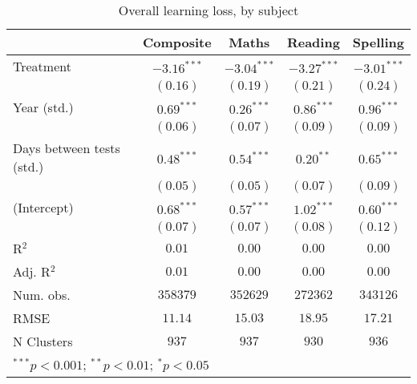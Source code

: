 
\begin{table}
\begin{center}
\begin{tabular}{l c c c c}
\hline
 & Composite & Maths & Reading & Spelling \\
\hline
Treatment                 & $-3.16^{***}$ & $-3.04^{***}$ & $-3.27^{***}$ & $-3.01^{***}$ \\
                          & $(0.16)$      & $(0.19)$      & $(0.21)$      & $(0.24)$      \\
Year (std.)               & $0.69^{***}$  & $0.26^{***}$  & $0.86^{***}$  & $0.96^{***}$  \\
                          & $(0.06)$      & $(0.07)$      & $(0.09)$      & $(0.09)$      \\
Days between tests (std.) & $0.48^{***}$  & $0.54^{***}$  & $0.20^{**}$   & $0.65^{***}$  \\
                          & $(0.05)$      & $(0.05)$      & $(0.07)$      & $(0.09)$      \\
(Intercept)               & $0.68^{***}$  & $0.57^{***}$  & $1.02^{***}$  & $0.60^{***}$  \\
                          & $(0.07)$      & $(0.07)$      & $(0.08)$      & $(0.12)$      \\
\hline
R$^2$                     & $0.01$        & $0.00$        & $0.00$        & $0.00$        \\
Adj. R$^2$                & $0.01$        & $0.00$        & $0.00$        & $0.00$        \\
Num. obs.                 & $358379$      & $352629$      & $272362$      & $343126$      \\
RMSE                      & $11.14$       & $15.03$       & $18.95$       & $17.21$       \\
N Clusters                & $937$         & $937$         & $930$         & $936$         \\
\hline
\multicolumn{5}{l}{\scriptsize{$^{***}p<0.001$; $^{**}p<0.01$; $^{*}p<0.05$}}
\end{tabular}
\caption{Overall learning loss, by subject}
\label{table:overall}
\end{center}
\end{table}
